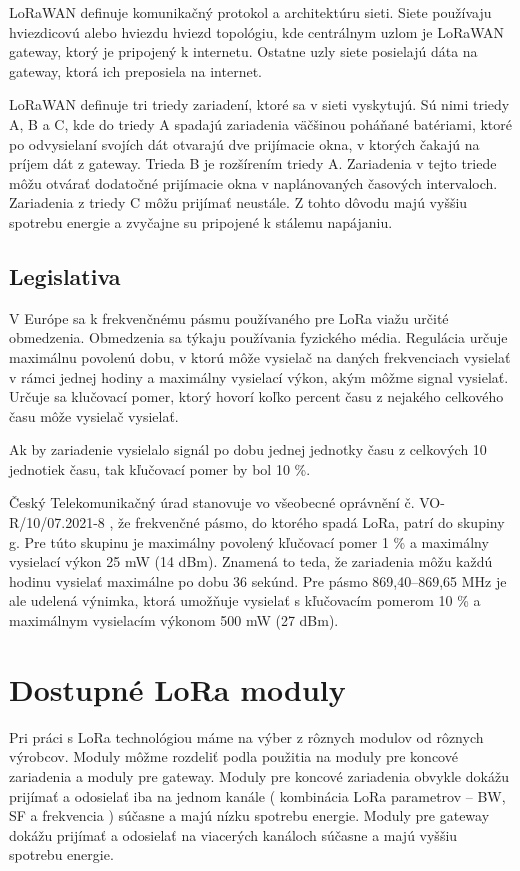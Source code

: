 \documentclass[slovak,master]{diploma}
\begin{document}
LoRaWAN definuje komunikačný protokol a architektúru sieti. Siete používaju hviezdicovú alebo hviezdu hviezd topológiu, kde 
centrálnym uzlom je LoRaWAN gateway, ktorý je pripojený k internetu. Ostatne uzly siete posielajú dáta na gateway, ktorá ich preposiela na internet.

LoRaWAN definuje tri triedy zariadení, ktoré sa v sieti vyskytujú. Sú nimi triedy A, B a C, kde do triedy A spadajú zariadenia 
väčšinou poháňané batériami, ktoré po odvysielaní svojích dát otvarajú dve prijímacie okna, v ktorých čakajú na príjem dát z gateway.
Trieda B je rozšírením triedy A. Zariadenia v tejto triede môžu otvárať dodatočné prijímacie okna v naplánovaných časových intervaloch.
Zariadenia z triedy C môžu prijímať neustále. Z tohto dôvodu majú vyššiu spotrebu energie a zvyčajne su pripojené k stálemu napájaniu.

\section{Legislativa}
V Európe sa k frekvenčnému pásmu používaného pre LoRa viažu určité obmedzenia. 
Obmedzenia sa týkaju používania fyzického média. Regulácia určuje maximálnu povolenú dobu, v ktorú môže vysielač na daných frekvenciach vysielať 
v rámci jednej hodiny a maximálny vysielací výkon, akým môžme signal vysielať.
Určuje sa klučovací pomer, ktorý hovorí koľko percent času z nejakého celkového času môže vysielač vysielať.

Ak by zariadenie vysielalo signál po dobu jednej jednotky času z celkových 10 jednotiek času, tak kľučovací pomer by bol 10 \%.

Český Telekomunikačný úrad \cite{ctu} stanovuje vo všeobecné oprávnění č. VO-R/10/07.2021-8 \cite{vor}, že 
frekvenčné pásmo, do ktorého spadá LoRa, patrí do skupiny g. Pre túto skupinu je maximálny povolený kľučovací pomer 1 \% a maximálny 
vysielací výkon 25 mW (14 dBm). Znamená to teda, že zariadenia môžu každú hodinu vysielať maximálne po dobu 36 sekúnd.
Pre pásmo 869,40--869,65 MHz je ale udelená výnimka, ktorá umožňuje vysielať s kľučovacím pomerom 10 \% a maximálnym vysielacím výkonom 500 mW (27 dBm).


\chapter{Dostupné LoRa moduly }
Pri práci s LoRa technológiou máme na výber z rôznych modulov od rôznych výrobcov.
Moduly môžme rozdeliť podla použitia na moduly pre koncové zariadenia a moduly pre gateway.
Moduly pre koncové zariadenia obvykle dokážu prijímať a odosielať iba na jednom kanále ( kombinácia LoRa parametrov --  BW, SF a frekvencia ) súčasne a majú 
nízku spotrebu energie. Moduly pre gateway dokážu prijímať a odosielať na viacerých kanáloch súčasne a majú vyššiu spotrebu energie.
\end{document}
